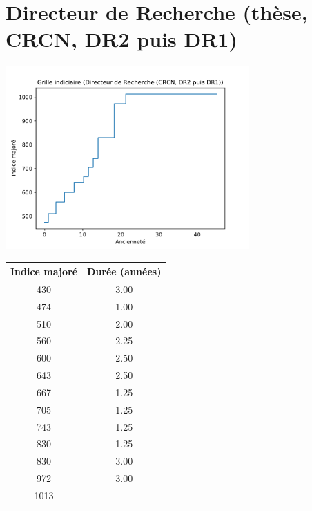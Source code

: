\newpage 
 
\chapter{Directeur de Recherche (thèse, CRCN, DR2 puis DR1)} 

\begin{minipage}{0.55\linewidth}\includegraphics[width=0.7\textwidth]{fig/grille_DR.pdf}\end{minipage} 
\begin{minipage}{0.3\linewidth} 
 \begin{center} 

\begin{tabular}[htb]{|c|c|} 
\hline 
 Indice majoré &  Durée (années) \\ 
\hline \hline 
 430 &  3.00 \\ 
\hline 
 474 &  1.00 \\ 
\hline 
 510 &  2.00 \\ 
\hline 
 560 &  2.25 \\ 
\hline 
 600 &  2.50 \\ 
\hline 
 643 &  2.50 \\ 
\hline 
 667 &  1.25 \\ 
\hline 
 705 &  1.25 \\ 
\hline 
 743 &  1.25 \\ 
\hline 
 830 &  1.25 \\ 
\hline 
 830 &  3.00 \\ 
\hline 
 972 &  3.00 \\ 
\hline 
 1013 &   \\ 
\hline 
\hline 
\end{tabular} 
\end{center} 
 \end{minipage} 


 \addto{\captionsenglish}{ \renewcommand{\mtctitle}{}} \setcounter{minitocdepth}{2} 
 \minitoc \newpage 

